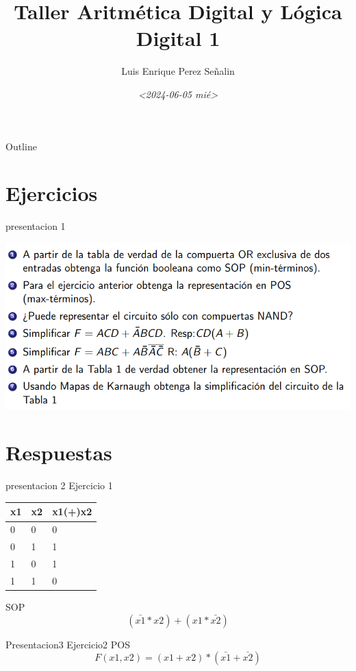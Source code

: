\documentclass[presentation]{beamer}
\author{Luis Enrique Perez Señalin}
\date{\textit{<2024-06-05 mié>}}
\title{Taller Aritmética Digital y Lógica Digital 1}
\begin{document}
\maketitle
\begin{frame}{Outline}
\tableofcontents
\end{frame}


\section{Ejercicios}
\label{sec:org249f098}
\begin{frame}[label={sec:org6d4aa2f}]{presentacion 1}
\begin{center}
\includegraphics[width=.9\linewidth]{./enunciado1.png}
\end{center}
\end{frame}


\section{Respuestas}
\label{sec:orge40582b}
\begin{frame}[label={sec:orgf3968cd}]{presentacion 2}
Ejercicio 1
\begin{center}
\begin{tabular}{|l|l|l|}
\hline
x1 & x2 & x1(+)x2 \\
\hline
0 & 0 & 0 \\
\hline
0 & 1 & 1 \\
\hline
1 & 0 & 1 \\
\hline
1 & 1 & 0 \\
\hline
\end{tabular}
\end{center}
SOP 
$$(\bar{x1}*x2)+(x1*\bar{x2})$$
\end{frame}

\begin{frame}[label={sec:orge60c196}]{Presentacion3}
Ejercicio2
POS
$$F(x1,x2) = (x1+x2) * (\bar{x1}+\bar{x2})$$
\end{frame}
\end{document}
